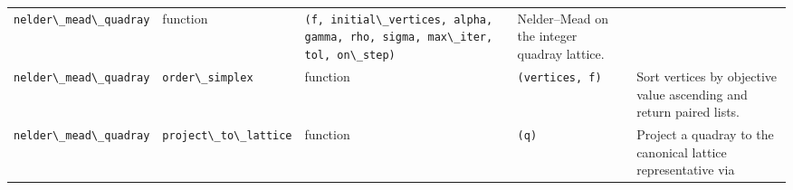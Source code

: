 \documentclass[
  10pt,
]{article}
\newcommand{\passthrough}[1]{#1}
\begin{document}
\begin{longtable}[]{@{}lllll@{}}
\begin{minipage}[t]{0.17\columnwidth}
\passthrough{\lstinline!nelder\_mead\_quadray!}\strut
\end{minipage} & \begin{minipage}[t]{0.17\columnwidth}\raggedright
function\strut
\end{minipage} & \begin{minipage}[t]{0.17\columnwidth}\raggedright
\passthrough{\lstinline!(f, initial\_vertices, alpha, gamma, rho, sigma, max\_iter, tol, on\_step)!}\strut
\end{minipage} & \begin{minipage}[t]{0.17\columnwidth}\raggedright
Nelder--Mead on the integer quadray lattice.\strut
\end{minipage}\tabularnewline
\begin{minipage}[t]{0.17\columnwidth}\raggedright
\passthrough{\lstinline!nelder\_mead\_quadray!}\strut
\end{minipage} & \begin{minipage}[t]{0.17\columnwidth}\raggedright
\passthrough{\lstinline!order\_simplex!}\strut
\end{minipage} & \begin{minipage}[t]{0.17\columnwidth}\raggedright
function\strut
\end{minipage} & \begin{minipage}[t]{0.17\columnwidth}\raggedright
\passthrough{\lstinline!(vertices, f)!}\strut
\end{minipage} & \begin{minipage}[t]{0.17\columnwidth}\raggedright
Sort vertices by objective value ascending and return paired
lists.\strut
\end{minipage}\tabularnewline
\begin{minipage}[t]{0.17\columnwidth}\raggedright
\passthrough{\lstinline!nelder\_mead\_quadray!}\strut
\end{minipage} & \begin{minipage}[t]{0.17\columnwidth}\raggedright
\passthrough{\lstinline!project\_to\_lattice!}\strut
\end{minipage} & \begin{minipage}[t]{0.17\columnwidth}\raggedright
function\strut
\end{minipage} & \begin{minipage}[t]{0.17\columnwidth}\raggedright
\passthrough{\lstinline!(q)!}\strut
\end{minipage} & \begin{minipage}[t]{0.17\columnwidth}\raggedright
Project a quadray to the canonical lattice representative via

\end{minipage}
\end{longtable}
\end{document}

